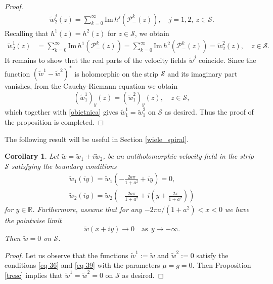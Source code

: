 \documentclass[11pt, letterpaper, reqno]{amsart}
\numberwithin{equation}{section}
\theoremstyle{definition}
\theoremstyle{plain}
\newtheorem{cor}[defi]{Corollary}
\numberwithin{equation}{section}
\def\R{\mathbb{R}}
\def\PP{\mathcal{P}}
\def\SS{\mathcal{S}}
\begin{document}
\begin{proof}
\begin{align*}
\tilde{w}_{2}^j(z) = \sum_{k=0}^{\infty}\mathrm{Im}\, h^j(\PP_{-}^{k}(z)), \quad j=1,2, \ z\in\SS.
\end{align*}
Recalling that $h^1(z) = h^2(z)$ for $z\in\SS$, we obtain
\begin{align*}
\tilde{w}_{2}^1(z) & = \sum_{k=0}^{\infty}\mathrm{Im}\, h^1(\PP_{-}^{k}(z)) = \sum_{k=0}^{\infty}\mathrm{Im}\, h^2(\PP_{-}^{k}(z)) = \tilde{w}_{2}^2(z), \quad z\in\SS.
\end{align*}
It remains to show that the real parts of the velocity fields $\tilde w^{j}$ coincide. Since the function $(\tilde{w}^{1}-\tilde{w}^{2})^{*}$ is holomorphic on the strip $\SS$ and its imaginary part vanishes, from the Cauchy-Riemann equation we obtain $$(\tilde{w}^{1}_{1})_{y}(z) = (\tilde{w}^{2}_{1})_{y}(z), \quad z\in\SS,$$ which together with \eqref{obietnica} gives
$\tilde{w}^{1}_{1} = \tilde{w}^{2}_{1}$ on $\SS$ as desired. Thus the proof of the proposition is completed. 
\end{proof}
The following result will be useful in Section \ref{wiele_spiral}.
\begin{cor}\label{cor-eq-zero}
Let $\tilde{w} = \tilde{w}_{1}+i\tilde{w}_{2}$, be an antiholomorphic velocity field in the strip $\SS$ satisfying the boundary conditions 
\begin{gather}
\tilde{w}_{1}(iy) = \tilde{w}_{1}\left(-\frac{2a\pi}{1+a^2} + iy\right) = 0, \\ 
\tilde{w}_{2}(iy) = \tilde{w}_{2}\left(-\frac{2a\pi}{1+a^2} + i\left(y + \frac{2\pi}{1+a^2}\right)\right)
\end{gather}
for $y\in\R$. Furthermore, assume that for any $-2\pi a/(1+a^2)<x<0$ we have the pointwise limit
\begin{equation*}
\tilde{w}(x+iy)\rightarrow 0\quad \text{as} \ \ y\to -\infty.
\end{equation*}
Then $\tilde{w} = 0$ on $\SS$.
\end{cor}
\begin{proof}
Let us observe that the functions $\tilde w^{1}:= \tilde w$ and $\tilde w^{2}:=0$ satisfy the conditions \eqref{eq-36} and \eqref{eq-39} with the parameters $ \mu =  g = 0$. Then Proposition \ref{tresc} implies that $\tilde{w}^1 = \tilde w^{2} = 0$ on $\SS$ as desired.
\end{proof}
\end{document}
